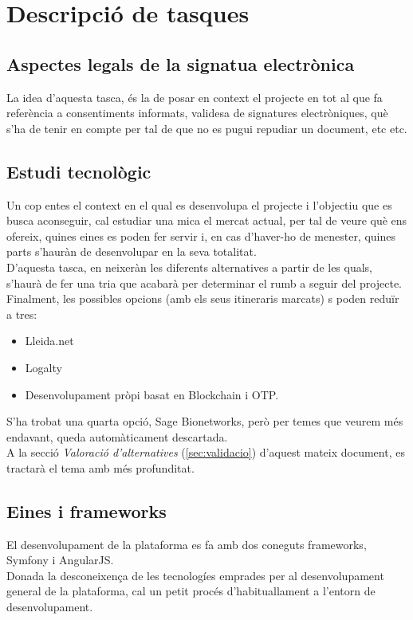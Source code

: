 \section{Descripció de tasques}
\subsection{Aspectes legals de la signatua electrònica}
La idea d'aquesta tasca, és la de posar en context el projecte en tot al que fa referència a consentiments informats, validesa de signatures electròniques, què s'ha de tenir en compte per tal de que no es pugui repudiar un document, etc etc.

\subsection{Estudi tecnològic}
Un cop entes el context en el qual es desenvolupa el projecte i l'objectiu que es busca aconseguir, cal estudiar una mica el mercat actual, per tal de veure què ens ofereix, quines eines es poden fer servir i, en cas d'haver-ho de menester, quines parts s'hauràn de desenvolupar en la seva totalitat.\\
\newline D'aquesta tasca, en neixeràn les diferents alternatives a partir de les quals, s'haurà de fer una tria que acabarà per determinar el rumb a seguir del projecte.\\
\newline Finalment, les possibles opcions (amb els seus itineraris marcats) s poden reduïr a tres:
\begin{itemize}
	\item Lleida.net
	\item Logalty
	\item Desenvolupament pròpi basat en Blockchain i OTP.
\end{itemize}
S'ha trobat una quarta opció, Sage Bionetworks, però per temes que veurem més endavant, queda automàticament descartada.\\
\newline A la secció \textit{Valoració d'alternatives} (\ref{sec:validacio}) d'aquest mateix document, es tractarà el tema amb més profunditat.

\subsection{Eines i frameworks}
El desenvolupament de la plataforma es fa amb dos coneguts frameworks, Symfony i AngularJS.\\
Donada la desconeixença de les tecnologíes emprades per al desenvolupament general de la plataforma, cal un petit procés d'habituallament a l'entorn de desenvolupament.

